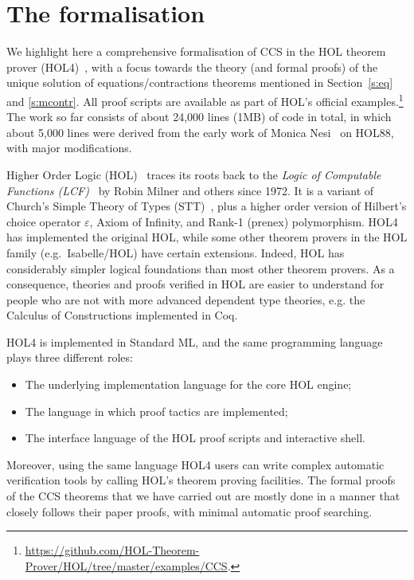 \documentclass[GCNS]{yincog}
\theoremstyle{remark}
\theoremstyle{theorem}
\theoremstyle{remark}
\begin{document}
\section{The formalisation}
 \label{s:for}

We highlight here a comprehensive formalisation of CCS in the HOL theorem
prover (HOL4)~\cite{Melham:1993vl,slind2008brief}, with a focus towards
the theory (and formal proofs) of the unique solution of equations/contractions
theorems mentioned in Section~\ref{s:eq} and \ref{s:mcontr}. All proof
scripts are available as part of HOL's official examples.\footnote{\url{https://github.com/HOL-Theorem-Prover/HOL/tree/master/examples/CCS}.}
The work so far consists of about 24,000 lines (1MB) of code in total,
in which about 5,000 lines were derived from the early work of Monica Nesi~\cite{Nesi:1992ve}
on HOL88, with major modifications.

Higher Order Logic (HOL)~\cite{hollogic} traces its roots back to the
\emph{Logic of Computable Functions (LCF)}~\cite{gordon1979edinburgh,milner1972logic}
by Robin Milner and others since 1972. It is a variant of Church's Simple
Theory of Types (STT)~\cite{church1940formulation}, plus a higher order
version of Hilbert's choice operator $\varepsilon $, Axiom of Infinity,
and Rank-1 (prenex) polymorphism. HOL4 has implemented the original HOL,
while some other theorem provers in the HOL family (e.g.~Isabelle/HOL)
have certain extensions. Indeed, HOL has considerably simpler logical foundations
than most other theorem provers. As a consequence, theories and proofs
verified in HOL are easier to understand for people who are not 
with more advanced dependent type theories, e.g. the Calculus of Constructions
implemented in Coq.

HOL4 is implemented in Standard ML, and the same programming language plays
three different roles:
%
\begin{itemize}
%
\item The underlying implementation language for the core HOL engine;
%
\item The language in which proof tactics are implemented;
%
\item The interface language of the HOL proof scripts and interactive shell.
%
\end{itemize}
%
Moreover, using the same language HOL4 users can write complex automatic
verification tools by calling HOL's theorem proving facilities. The formal
proofs of the CCS theorems that we have carried out are mostly done in
a manner that closely follows their paper proofs, with minimal automatic
proof searching.
\end{document}
